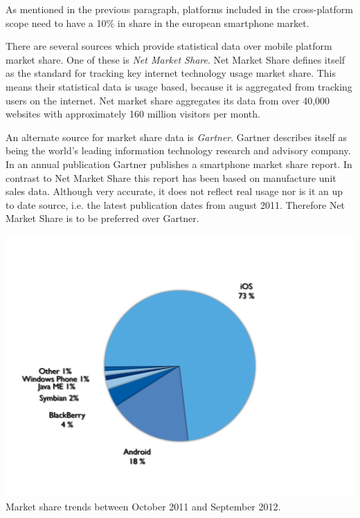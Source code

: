 As mentioned in the previous paragraph, platforms included in the cross-platform scope need to have a 10\% in share in the european smartphone market. 

There are several sources which provide statistical data over mobile platform market share. One of these is \emph{Net Market Share}. Net Market Share defines itself as the standard for tracking key internet technology usage market share. This means their statistical data is usage based, because it is aggregated from tracking users on the internet. Net market share aggregates its data from over 40,000 websites with approximately 160 million visitors per month.\cite{NetApplications2012}


An alternate source for market share data is \emph{Gartner}. Gartner describes itself as being the world's leading information technology research and advisory company.\cite{Gartner2012} In an annual publication Gartner publishes a smartphone market share report. In contrast to Net Market Share this report has been based on manufacture unit sales data. Although very accurate, it does not reflect real usage nor is it an up to date source, i.e. the latest publication dates from august 2011.\cite{Pettey2011} Therefore Net Market Share is to be preferred over Gartner.


\begin{centering}
\includegraphics[scale=0.30]{images/netmarketshare_march2012.png}\\{Market share trends between October 2011 and September 2012.\cite{Netmarketshare2012}}\\
\end{centering}


